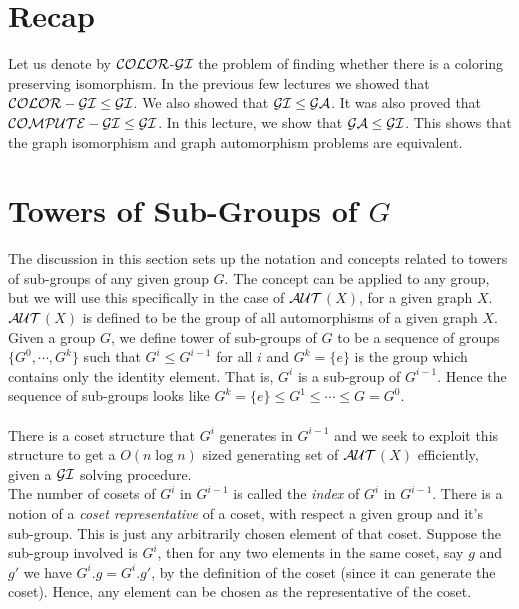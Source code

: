 

\section{Recap}
Let us denote by $\cal{COLOR}$-$\cal{GI}$ the problem of finding whether there is a coloring preserving isomorphism. 
In the previous few lectures we showed that $\cal{COLOR}-\cal{GI} \le \cal{GI}$.
We also showed that $\cal{GI} \le \cal{GA}$. It was also proved that $\cal{COMPUTE}-\cal{GI} \le \cal{GI}$. In this lecture, we show that $\cal{GA} \le \cal{GI}$. This shows that the graph isomorphism and graph automorphism problems are equivalent.


\section{Towers of Sub-Groups of $G$}
The discussion in this section sets up the notation and concepts related to towers of sub-groups of any given group $G$.
The concept can be applied to any group, but we will use this specifically in the case of $\cal{AUT}$$(X)$, for a given graph $X$. $\cal{AUT}$$(X)$ is defined to be the group of all automorphisms of a given graph $X$.\\
Given a group $G$, we define tower of sub-groups of $G$ to be a sequence of groups 
$\{G^{0}, \cdots, G^{k}\}$ such that $G^{i} \le G^{i-1}	$ for all $i$ and $G^{k} = \{e\}$ is the group
 which contains only the identity element. That is, $G^{i}$ is a sub-group of $G^{i-1}$. 
Hence the sequence of sub-groups looks like $G^{k} = \{e\} \le  G^{1} \le \cdots \le G = G^{0}$. \\\\
There is a coset structure that $G^{i}$ generates in $G^{i-1}$ and we seek to exploit this structure to get a
 $O(n\log n)$ sized generating set of $\cal{AUT}$$(X)$ efficiently, given a $\cal{GI}$ solving procedure. \\
The number of cosets of $G^{i}$ in $G^{i-1}$ is called the {\it index} of $G^{i}$ in $G^{i-1}$.
There is a notion of a {\it coset representative} of a coset, with respect a given group and it's sub-group.
This is just any arbitrarily chosen element of that coset. Suppose the sub-group involved is $G^{i}$,
then for any two elements in the same coset, say $g$ and $g'$ we have $G^{i}.g = G^{i}.g'$, by the definition of the coset (since it can generate the coset).
Hence, any element can be chosen as the representative of the coset.

